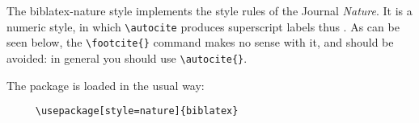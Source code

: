 
\usepackage[style=british]{csquotes}
\usepackage[style=nature,backend=biber]{biblatex}

\renewcommand{\showingstyle}{Nature}

%
The \textsf{biblatex-nature} style implements the style rules of the Journal \emph{Nature}. It is a numeric style, in which \verb~\autocite~ produces superscript labels thus \autocite{worman}. As can be seen below, the \verb|\footcite{}| command makes no sense with it, and should be avoided: in general you should use \verb|\autocite{}|.

\quad The package is loaded in the usual way:
\begin{verbatim}
     \usepackage[style=nature]{biblatex}
\end{verbatim}





